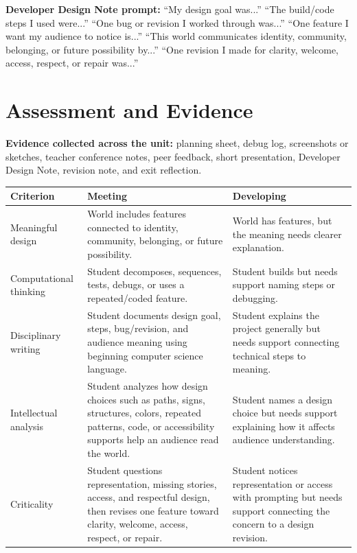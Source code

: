 \textbf{Developer Design Note prompt:} \textcolor{LessonTwoAccent}{``My design goal was...'' ``The build/code steps I used were...'' ``One bug or revision I worked through was...'' ``One feature I want my audience to notice is...'' ``This world communicates identity, community, belonging, or future possibility by...'' ``One revision I made for clarity, welcome, access, respect, or repair was...''}

\newpage
\section*{Assessment and Evidence}

\textbf{Evidence collected across the unit:} planning sheet, debug log, screenshots or sketches, teacher conference notes, peer feedback, short presentation, Developer Design Note, revision note, and exit reflection.

\renewcommand{\arraystretch}{0.95}
\setlength{\tabcolsep}{3pt}
\begin{tabularx}{\textwidth}{|>{\raggedright\arraybackslash}p{}|Y|Y|}
\hline
{}
\textbf{Criterion} & \textbf{Meeting} & \textbf{Developing} \\ \hline
Meaningful design & World includes features connected to identity, community, belonging, or future possibility. & World has features, but the meaning needs clearer explanation. \\ \hline
Computational thinking & Student decomposes, sequences, tests, debugs, or uses a repeated/coded feature. & Student builds but needs support naming steps or debugging. \\ \hline
Disciplinary writing & Student documents design goal, steps, bug/revision, and audience meaning using beginning computer science language. & Student explains the project generally but needs support connecting technical steps to meaning. \\ \hline
Intellectual analysis & Student analyzes how design choices such as paths, signs, structures, colors, repeated patterns, code, or accessibility supports help an audience read the world. & Student names a design choice but needs support explaining how it affects audience understanding. \\ \hline
Criticality & \textcolor{LessonTwoAccent}{Student questions representation, missing stories, access, and respectful design, then revises one feature toward clarity, welcome, access, respect, or repair.} & \textcolor{LessonTwoAccent}{Student notices representation or access with prompting but needs support connecting the concern to a design revision.} \\ \hline
\end{tabularx}

